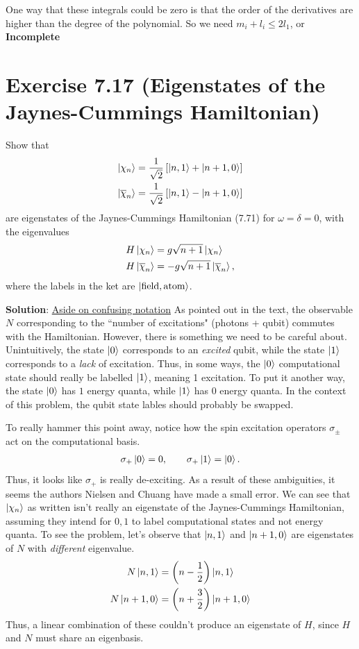 \documentclass{book}
\begin{document}
    One way that these integrals could be zero is that the order of the derivatives are higher than the degree of the polynomial. So we need $m_i + l_i \leq 2l_1$, or \textbf{Incomplete}


\section*{Exercise 7.17 (Eigenstates of the Jaynes-Cummings Hamiltonian)}
    Show that 
    \begin{align}
        \ket{\chi_n} = \frac{1}{\sqrt{2}}\left[\ket{n,1} + \ket{n+1,0}\right] \\
        \ket{\overline{\chi}_n} = \frac{1}{\sqrt{2}}\left[\ket{n,1} - \ket{n+1,0}\right]
    \end{align}
    are eigenstates of the Jaynes-Cummings Hamiltonian (7.71) for $\omega = \delta = 0$, with the eigenvalues
    \begin{align}
        H \ket{\chi_n} &= g\sqrt{n+1} \ket{\chi_n} \\
        H\ket{\overline{\chi}_n} &= -g\sqrt{n+1}\ket{\overline{\chi}_n},
    \end{align}
    where the labels in the ket are $\ket{\text{field}, \text{atom}}$.

    \textbf{Solution}: \underline{Aside on confusing notation} As pointed out in the text, the observable $N$ corresponding to the ``number of excitations" (photons + qubit) commutes with the Hamiltonian. However, there is something we need to be careful about. Unintuitively, the state $\ket{0}$ corresponds to an \emph{excited} qubit, while the state $\ket{1}$ corresponds to a \emph{lack} of excitation. Thus, in some ways, the $\ket{0}$ computational state should really be labelled $\ket{1}$, meaning 1 excitation. To put it another way, the state $\ket{0}$ has $1$ energy quanta, while $\ket{1}$ has $0$ energy quanta. In the context of this problem, the qubit state lables should probably be swapped. 

    To really hammer this point away, notice how the spin excitation operators $\sigma_\pm$ act on the computational basis.
    \begin{align}
        \sigma_+ \ket{0} = 0, \qquad \sigma_+ \ket{1} = \ket{0}.
    \end{align}
    Thus, it looks like $\sigma_+$ is really de-exciting. As a result of these ambiguities, it seems the authors Nielsen and Chuang have made a small error. We can see that $\ket{\chi_n}$ as written isn't really an eigenstate of the Jaynes-Cummings Hamiltonian, assuming they intend for $0,1$ to label computational states and not energy quanta. To see the problem, let's observe that $\ket{n,1}$ and $\ket{n+1, 0}$ are eigenstates of $N$ with \emph{different} eigenvalue.
    \begin{align}
    \begin{aligned}
        N \ket{n,1} &= \left(n - \frac{1}{2}\right) \ket{n,1} \\
        N \ket{n+1, 0} &= \left(n+\frac{3}{2}\right) \ket{n+1,0}
    \end{aligned}
    \end{align}
    Thus, a linear combination of these couldn't produce an eigenstate of $H$, since $H$ and $N$ must share an eigenbasis. 
\end{document}
